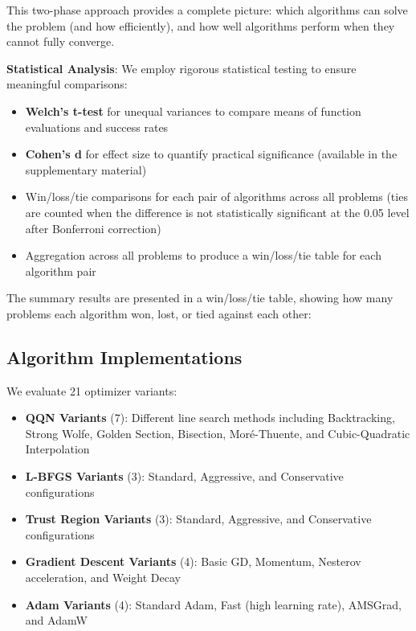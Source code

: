 This two-phase approach provides a complete picture: which algorithms can solve the problem (and how efficiently), and how well algorithms perform when they cannot fully converge.

\textbf{Statistical Analysis}: We employ rigorous statistical testing to ensure meaningful comparisons:

\begin{itemize}
\tightlist
\item
  \textbf{Welch's t-test} for unequal variances to compare means of function evaluations and success rates
\item
  \textbf{Cohen's d} for effect size to quantify practical significance (available in the supplementary material)
\item
  Win/loss/tie comparisons for each pair of algorithms across all problems (ties are counted when the difference is not statistically significant at the 0.05 level after Bonferroni correction)
\item
  Aggregation across all problems to produce a win/loss/tie table for each algorithm pair
\end{itemize}

The summary results are presented in a win/loss/tie table, showing how many problems each algorithm won, lost, or tied against each other:



\hypertarget{algorithm-implementations}{%
\subsection{Algorithm Implementations}\label{algorithm-implementations}}

We evaluate 21 optimizer variants:

\begin{itemize}
\tightlist
\item
  \textbf{QQN Variants} (7): Different line search methods including Backtracking, Strong Wolfe, Golden Section, Bisection, Moré-Thuente, and Cubic-Quadratic Interpolation
\item
  \textbf{L-BFGS Variants} (3): Standard, Aggressive, and Conservative configurations
\item
  \textbf{Trust Region Variants} (3): Standard, Aggressive, and Conservative configurations
\item
  \textbf{Gradient Descent Variants} (4): Basic GD, Momentum, Nesterov acceleration, and Weight Decay
\item
  \textbf{Adam Variants} (4): Standard Adam, Fast (high learning rate), AMSGrad, and AdamW
\end{itemize}

